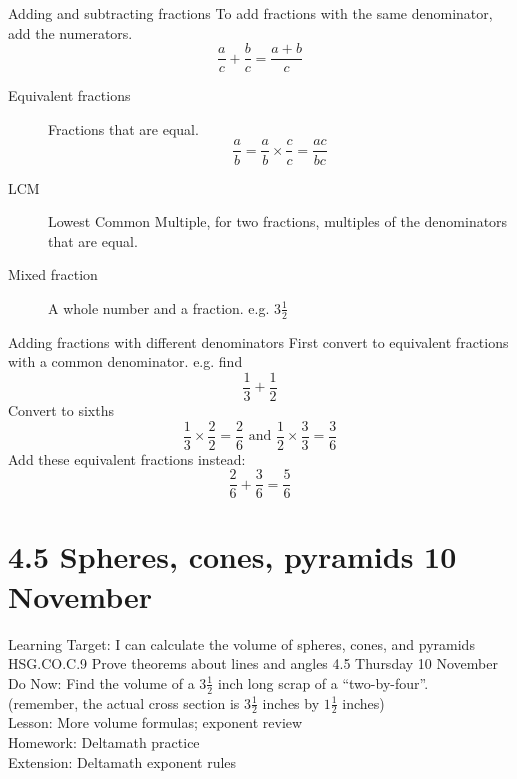 \documentclass[onlytextwidth, aspectratio=169]{beamer}
\begin{document}
\begin{frame}{Adding and subtracting fractions}
  To add fractions with the same denominator, add the numerators.
  $$\frac{a}{c} + \frac{b}{c} =\frac{a + b}{c}$$
  \begin{description}
    \item[Equivalent fractions] Fractions that are equal. 
    $$\frac{a}{b} = \frac{a}{b} \times \frac{c}{c} = \frac{ac}{bc}$$
    \item[LCM] Lowest Common Multiple, for two fractions, multiples of the denominators that are equal.
    \item[Mixed fraction] A whole number and a fraction. e.g. $3 \frac{1}{2}$
  \end{description}
  \end{frame}

\begin{frame}{Adding fractions with different denominators}
  First convert to equivalent fractions with a common denominator. e.g. find
  $$\frac{1}{3} + \frac{1}{2}$$
  Convert to sixths
  $$\frac{1}{3} \times \frac{2}{2} = \frac{2}{6} \text{ and } \frac{1}{2} \times \frac{3}{3} = \frac{3}{6}$$
  Add these equivalent fractions instead:
  $$\frac{2}{6} + \frac{3}{6} = \frac{5}{6} $$
  \end{frame}

\section{4.5 Spheres, cones, pyramids \hfill 10 November \,}
\begin{frame}{Learning Target: I can calculate the volume of spheres, cones, and pyramids}
  {HSG.CO.C.9 Prove theorems about lines and angles  \hfill \alert{4.5 Thursday 10 November}}
  Do Now: Find the volume of a $3 \frac{1}{2}$ inch long scrap of a ``two-by-four''. \\
    (remember, the actual cross section is $3 \frac{1}{2}$ inches by $1 \frac{1}{2}$ inches) \\[0.5cm]
    Lesson: More volume formulas; exponent review \\
    Homework: Deltamath practice \\
    Extension: Deltamath exponent rules
\end{frame}
\end{document}
